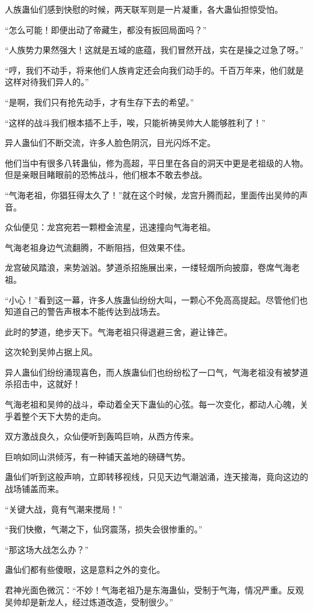 \begin{this_body}
人族蛊仙们感到快慰的时候，两天联军则是一片凝重，各大蛊仙担惊受怕。

“怎么可能！即便出动了帝藏生，都没有扳回局面吗？”

“人族势力果然强大！这就是五域的底蕴，我们冒然开战，实在是操之过急了呀。”

“哼，我们不动手，将来他们人族肯定还会向我们动手的。千百万年来，他们就是这样对待我们异人的。”

“是啊，我们只有抢先动手，才有生存下去的希望。”

“这样的战斗我们根本插不上手，唉，只能祈祷吴帅大人能够胜利了！”

异人蛊仙们不断交流，许多人脸色阴沉，目光闪烁不定。

他们当中有很多八转蛊仙，修为高超，平日里在各自的洞天中更是老祖级的人物。但是亲眼目睹眼前的恐怖战斗，他们根本不敢去参战。

“气海老祖，你猖狂得太久了！”就在这个时候，龙宫升腾而起，里面传出吴帅的声音。

众仙便见：龙宫宛若一颗橙金流星，迅速撞向气海老祖。

气海老祖身边气流翻腾，不断阻挡，但效果不佳。

龙宫破风踏浪，来势汹汹。梦道杀招施展出来，一缕轻烟所向披靡，卷席气海老祖。

“小心！”看到这一幕，许多人族蛊仙纷纷大叫，一颗心不免高高提起。尽管他们也知道自己的警告声根本不能传达到战场去。

此时的梦道，绝步天下。气海老祖只得退避三舍，避让锋芒。

这次轮到吴帅占据上风。

异人蛊仙们纷纷涌现喜色，而人族蛊仙们也纷纷松了一口气，气海老祖没有被梦道杀招击中，这就好！

气海老祖和吴帅的战斗，牵动着全天下蛊仙的心弦。每一次变化，都动人心魄，关乎着整个天下大势的走向。

双方激战良久，众仙便听到轰鸣巨响，从西方传来。

巨响如同山洪倾泻，有一种铺天盖地的磅礴气势。

蛊仙们听到这般声响，立即转移视线，只见天边气潮汹涌，连天接海，竟向这边的战场铺盖而来。

“关键大战，竟有气潮来搅局！”

“我们快撤，气潮之下，仙窍震荡，损失会很惨重的。”

“那这场大战怎么办？”

蛊仙们都有些傻眼，这是意料之外的变化。

君神光面色微沉：“不妙！气海老祖乃是东海蛊仙，受制于气海，情况严重。反观吴帅却是新龙人，经过炼道改造，受制很少。”


\end{this_body}
